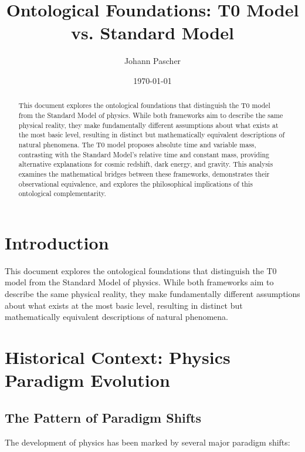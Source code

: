 \documentclass[12pt,a4paper]{article}
\title{Ontological Foundations: T0 Model vs. Standard Model}
\author{Johann Pascher}
\date{\today}
\begin{document}
	
	\maketitle
	
	\begin{abstract}
		This document explores the ontological foundations that distinguish the T0 model from the Standard Model of physics. While both frameworks aim to describe the same physical reality, they make fundamentally different assumptions about what exists at the most basic level, resulting in distinct but mathematically equivalent descriptions of natural phenomena. The T0 model proposes absolute time and variable mass, contrasting with the Standard Model's relative time and constant mass, providing alternative explanations for cosmic redshift, dark energy, and gravity. This analysis examines the mathematical bridges between these frameworks, demonstrates their observational equivalence, and explores the philosophical implications of this ontological complementarity.
	\end{abstract}
	
	\tableofcontents
	\newpage
	
	\section{Introduction}
	
	This document explores the ontological foundations that distinguish the T0 model from the Standard Model of physics. While both frameworks aim to describe the same physical reality, they make fundamentally different assumptions about what exists at the most basic level, resulting in distinct but mathematically equivalent descriptions of natural phenomena.
	
	\section{Historical Context: Physics Paradigm Evolution}
	
	\subsection{The Pattern of Paradigm Shifts}
	
	The development of physics has been marked by several major paradigm shifts:
	
\end{document}
